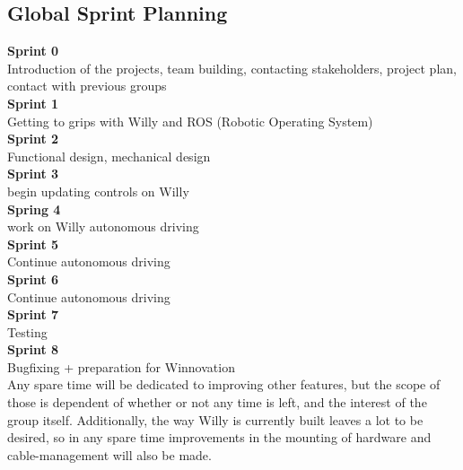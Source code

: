 \subsection{Global Sprint Planning}
\noindent \textbf{Sprint 0}\\
Introduction of the projects, team building, contacting stakeholders, project plan, contact with previous groups\\
\textbf{Sprint 1}\\
Getting to grips with Willy and ROS (Robotic Operating System)\\
\textbf{Sprint 2}\\
Functional design, mechanical design\\
\textbf{Sprint 3}\\
begin updating controls on Willy\\
\textbf{Spring 4}\\
work on Willy autonomous driving\\
\textbf{Sprint 5}\\
Continue autonomous driving\\
\textbf{Sprint 6} \\
Continue autonomous driving\\
\textbf{Sprint 7}\\
Testing\\
\textbf{Sprint 8}\\
Bugfixing + preparation for Winnovation \\

Any spare time will be dedicated to improving other features, but the scope of those is dependent of whether or not any time is left, and the interest of the group itself.
Additionally, the way Willy is currently built leaves a lot to be desired, so in any spare time improvements in the mounting of hardware and cable-management will also be made.

 \newpage
